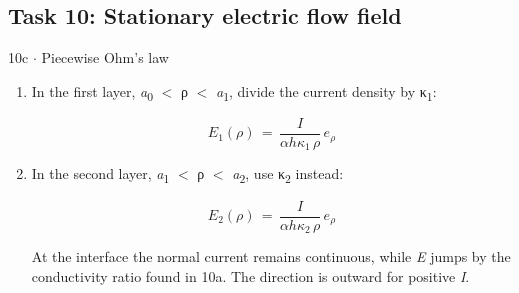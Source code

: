 \documentclass[11pt]{article}
\begin{document}
\begin{keepsection}\subsection{Task 10: Stationary electric flow field}

\begin{workedbox}{10c \ensuremath{\cdot} Piecewise Ohm’s law}
\begin{enumerate}
\item {}
In the first layer, \textit{a}\textsubscript{0} \ensuremath{<} ρ \ensuremath{<} \textit{a}\textsubscript{1}, divide the current density by κ\textsubscript{1}:

\begin{equation*}{E}_{1}(ρ)\, =\, \dfrac{{I}}{α{h}κ_{1}\, ρ}\, {e}_{ρ}\end{equation*}
\item {}
In the second layer, \textit{a}\textsubscript{1} \ensuremath{<} ρ \ensuremath{<} \textit{a}\textsubscript{2}, use κ\textsubscript{2} instead:

\begin{equation*}{E}_{2}(ρ)\, =\, \dfrac{{I}}{α{h}κ_{2}\, ρ}\, {e}_{ρ}\end{equation*}

At the interface the normal current remains continuous, while \textit{E} jumps by the conductivity ratio found in 10a. The direction is outward for positive \textit{I}.


\end{enumerate}
\end{workedbox}
\end{keepsection}
\end{document}
